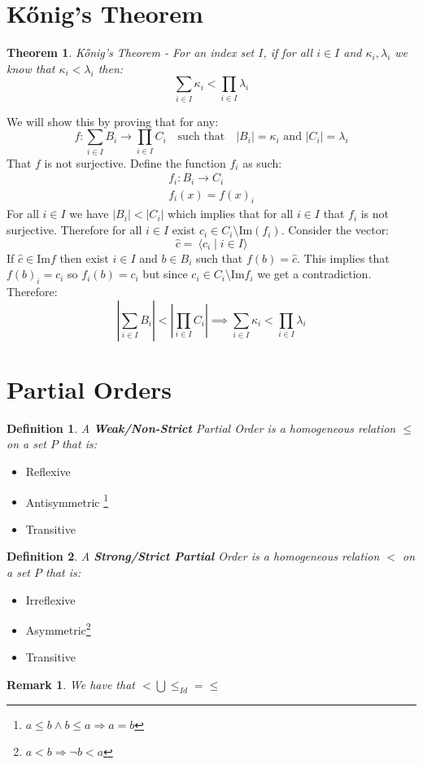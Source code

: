 \documentclass{article}
\theoremstyle{plain}
\newtheorem{theorem}{Theorem}[section]
\newtheorem{definition}{Definition}[section]
\newtheorem{remark}{Remark}[section]
\begin{document}
\newpage
\section{Kőnig's Theorem}
	\begin{theorem}
	Kőnig's Theorem - For an index set $I$, if for all $i \in I$ and 
	$\kappa_i, \lambda_i$ we know that $\kappa_i < \lambda_i$ then:
	\[
		\sum_{i\in I}{\kappa_i} < \prod_{i\in I}{\lambda_i}
	\]
	\end{theorem}
	\noindent We will show this by proving that for any:
	\[
		f \colon \sum_{i\in I}{B_i} \to \prod_{i\in I}{C_i} 
		\quad\text{such that}\quad
		|B_i| = \kappa_i \text{ and } |C_i|=\lambda_i
	\]
	That $f$ is not surjective. Define the function $f_i$ as such:
	\begin{align*}
		f_i \colon B_i \to C_i \\
		f_i(x) = f(x)_i
	\end{align*}
	For all $i\in I$ we have $|B_i|<|C_i|$ which implies that for all 
	$i\in I$ that $f_i$ is not surjective. Therefore for all $i\in I$ exist 
	$c_i \in C_i \setminus \mathrm{Im}(f_i)$. Consider the vector: 
	\[
		\hat{c} = \ \langle c_i \mid i\in I \rangle
	\]
	If $\hat{c} \in \mathrm{Im} f$ then exist $i \in I$ and 
	$b \in B_i$ such that $f(b) = \hat{c}$. This implies that $f(b)_i=c_i$
	so $f_i(b)=c_i$ but since $c_i \in C_i\setminus \mathrm{Im}f_i$
	we get a contradiction. Therefore: 
	\[
		\left| \sum_{i\in I}{B_i} \right| < \left|\prod_{i\in I}{C_i}\right| 
		\implies
		\sum_{i\in I}{\kappa_i} < \prod_{i\in I}{\lambda_i}
	\]

\newpage

\section{Partial Orders}
\begin{definition}
	A \textbf{Weak/Non-Strict} Partial Order is a homogeneous relation 
	$\le$ on a set $P$ that is:
\end{definition}
\begin{itemize}
	\item Reflexive
	\item Antisymmetric \footnote[1]{$a\le b \land b\le a \Rightarrow a=b$}
	\item Transitive
	\end{itemize}
\begin{definition}
	A \textbf{Strong/Strict Partial} Order is a homogeneous relation 
	$<$ on a set $P$ that is:
\end{definition}
\begin{itemize}
\item Irreflexive
\item Asymmetric\footnote[2]{$a<b \Rightarrow \lnot b<a$}
\item Transitive
\end{itemize}
\begin{remark}
	We have that $< \bigcup \le_{Id} = \le$
\end{remark}
\end{document}
